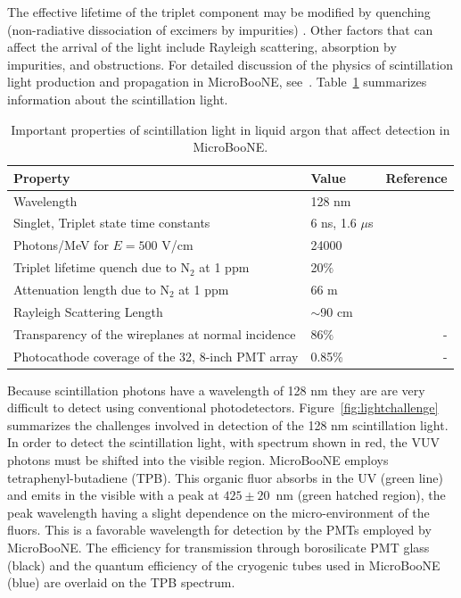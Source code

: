 The effective lifetime of the triplet component may be modified by quenching (non-radiative dissociation of excimers by impurities)  \cite{Acciarri:2008kv}.  Other factors that can affect the arrival of the light include Rayleigh scattering, absorption by impurities, and obstructions.  For detailed discussion of the physics of scintillation light production and propagation in MicroBooNE, see~\cite{Jones:2015bya}. Table~\ref{tab:lightparam} summarizes information about the scintillation light.  

\begin{table}
   \centering
    \caption{Important properties of scintillation light in liquid argon that affect detection in MicroBooNE.} 
    \begin{tabular}{llr} %
    \hline
    Property & Value & Reference\\
    \hline
    Wavelength & 128 nm & \cite{SUZUKI1979197}\\
    Singlet, Triplet state time constants & 6 ns, 1.6 $\mu$s &\cite{PhysRevB.27.5279} \\
    Photons/MeV for $E=500$ V/cm & 24000 & \cite{Amerio:2004-T600}\\
     Triplet lifetime quench due to N$_2$ at 1 ppm  & 20$\%$ & \cite{Acciarri:2008kv} \\
     Attenuation length due to N$_2$ at 1 ppm & 66 m &\cite{Jones:2013bca} \\
     Rayleigh Scattering Length & $\sim$90 cm &\cite{1997NIMPA.384..380I} \\
     Transparency of the wireplanes at normal incidence & 86$\%$ & -\\
     Photocathode coverage of the 32, 8-inch PMT array & 0.85\% & -\\
    \hline
   \end{tabular}
   \label{tab:lightparam}
\end{table} 


Because scintillation photons have a wavelength of 128 nm they are are very difficult to detect using conventional photodetectors.  Figure~\ref{fig:lightchallenge} summarizes the challenges involved in detection of the 128 nm scintillation light.  
In order to detect the scintillation light, with spectrum shown in red, the VUV photons must be shifted into the visible region.   MicroBooNE employs tetraphenyl-butadiene (TPB).
This organic fluor absorbs in the UV (green line) and emits in the visible with a peak at $425\pm20$~nm (green hatched region), the peak wavelength having a slight dependence on the micro-environment of the fluors.  This is a favorable wavelength for detection by the PMTs employed by MicroBooNE.  The efficiency for transmission through borosilicate PMT glass (black) and the quantum efficiency of the cryogenic tubes used in MicroBooNE (blue) are overlaid on the TPB spectrum.

